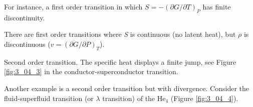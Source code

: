\documentclass[../../Main/Main.tex]{subfiles}
\begin{document}
\begin{example}{}{}
For instance, a first order transition in which \( S=-(\partial{G}/\partial{T}  )_P \) has finite discontinuity.
\end{example}
\begin{remark}
There are first order transitions where \emph{S} is continuous (no latent heat), but \( \rho  \) is discontinuous (\( v = (\partial{G}/\partial{P}  )_T \)).
\end{remark}
\begin{example}{}{}
Second order transition. The specific heat displays a finite jump, see Figure \ref{fig:3_04_3} in the conductor-superconductor transition.

Another example is a second order transition but with divergence. Consider the fluid-superfluid transition (or \( \lambda  \) transition) of the \( \text{He}_4 \) (Figure \ref{fig:3_04_4}).
\end{example}
\end{document}

